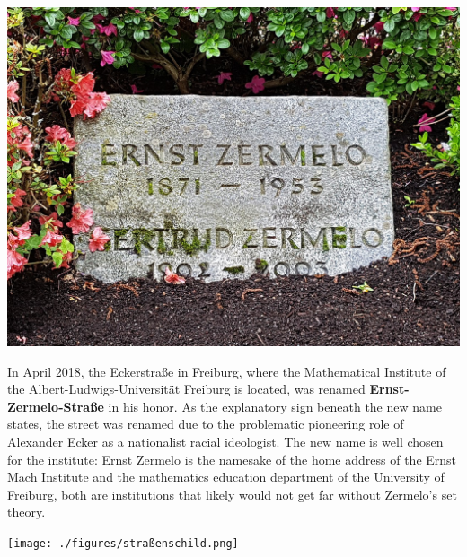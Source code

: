 \documentclass[landscape, a4paper]{article}
\newcommand\alert[1]{\textcolor{PrimaryColor}{\textbf{#1}}}
\begin{document}
\begin{minipage}[t]{0.31\textwidth}
	\vspace{0cm}
	\setlength{\parskip}{0.25cm}

	\includegraphics[width=\linewidth]{./figures/grabstein.png}
	\setlength{\parskip}{0.25cm}

  In April 2018, the Eckerstraße in Freiburg, where the Mathematical Institute of the Albert-Ludwigs-Universität Freiburg is located, was renamed \alert{Ernst-Zermelo-Straße} in his honor. As the explanatory sign beneath the new name states, the street was renamed due to the problematic pioneering role of Alexander Ecker as a nationalist racial ideologist. The new name is well chosen for the institute: Ernst Zermelo is the namesake of the home address of the Ernst Mach Institute and the mathematics education department of the University of Freiburg, both are institutions that likely would not get far without Zermelo's set theory. %


	\texttt{[image: ./figures/straßenschild.png]}
	\setlength{\parskip}{0.25cm}
\end{minipage}%
\hfill%
\vrule width 0.01cm
\hfill%
\end{document}
